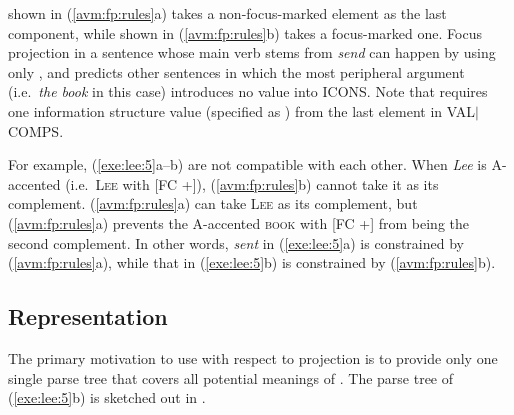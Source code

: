 \noindent {} shown in
(\ref{avm:fp:rules}a) takes a non-focus-marked element as the last
component, while  shown in
(\ref{avm:fp:rules}b) takes a focus-marked one. Focus projection in a
sentence whose main verb stems from \textit{send} can happen by using
only , and 
predicts other sentences in which the most peripheral argument
(i.e.\ \textit{the book} in this case) introduces no 
value into ICONS. Note that
 requires one information structure value
(specified as ) from the last element in
VAL{$\mid$}COMPS.


For example, (\ref{exe:lee:5}a--b) are not compatible with each
other. When \textit{Lee} is A-accented (i.e.\ \textsc{Lee} with [FC
  +]), (\ref{avm:fp:rules}b) cannot take it as its
complement. (\ref{avm:fp:rules}a) can take \textsc{Lee} as its
complement, but (\ref{avm:fp:rules}a) prevents the A-accented
\textsc{book} with [FC +] from being the second complement.  In other
words, \textit{sent} in (\ref{exe:lee:5}a) is constrained by
(\ref{avm:fp:rules}a), while that in (\ref{exe:lee:5}b) is constrained
by (\ref{avm:fp:rules}b).






\subsection{Representation}
\label{10-4:ssec:representation}


The primary motivation to use  with respect to 
projection is to provide only one single parse tree that covers all
potential meanings of . The parse tree of
(\ref{exe:lee:5}b) is sketched out in .



